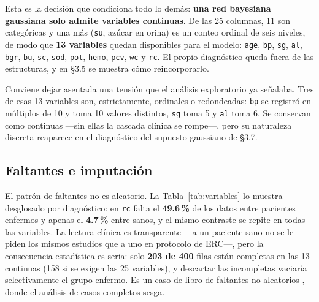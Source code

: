 \documentclass[11pt, a4paper]{article}
\begin{document}
Esta es la decisión que condiciona todo lo demás: \textbf{una red bayesiana gaussiana solo admite
variables continuas}. De las 25 columnas, 11 son categóricas y una más (\texttt{su}, azúcar en
orina) es un conteo ordinal de seis niveles, de modo que \textbf{13 variables} quedan disponibles
para el modelo: \texttt{age}, \texttt{bp}, \texttt{sg}, \texttt{al}, \texttt{bgr}, \texttt{bu},
\texttt{sc}, \texttt{sod}, \texttt{pot}, \texttt{hemo}, \texttt{pcv}, \texttt{wc} y \texttt{rc}.
El propio diagnóstico queda fuera de las estructuras, y en \S3.5 se muestra cómo reincorporarlo.

Conviene dejar asentada una tensión que el análisis exploratorio ya señalaba. Tres de esas 13
variables son, estrictamente, ordinales o redondeadas: \texttt{bp} se registró en múltiplos de 10 y
toma 10 valores distintos, \texttt{sg} toma 5 y \texttt{al} toma 6. Se conservan como continuas
—sin ellas la cascada clínica se rompe—, pero su naturaleza discreta reaparece en el diagnóstico
del supuesto gaussiano de \S3.7.

\subsection{Faltantes e imputación}

El patrón de faltantes no es aleatorio. La Tabla~\ref{tab:variables} lo muestra desglosado por
diagnóstico: en \texttt{rc} falta el \textbf{49.6\,\%} de los datos entre pacientes enfermos y
apenas el \textbf{4.7\,\%} entre sanos, y el mismo contraste se repite en todas las variables. La
lectura clínica es transparente —a un paciente sano no se le piden los mismos estudios que a uno
en protocolo de ERC—, pero la consecuencia estadística es seria: solo \textbf{203 de 400} filas
están completas en las 13 continuas (158 si se exigen las 25 variables), y descartar las
incompletas vaciaría selectivamente el grupo enfermo. Es un caso de libro de faltantes no
aleatorios \cite{rubin1976}, donde el análisis de casos completos sesga.
\end{document}
